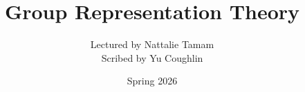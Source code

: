 \documentclass{article}
\begin{document}
\title{Group Representation Theory}
\author{Lectured by Nattalie Tamam \\
Scribed by Yu Coughlin}
\date{Spring 2026}

\maketitle

\tableofcontents
\end{document}
